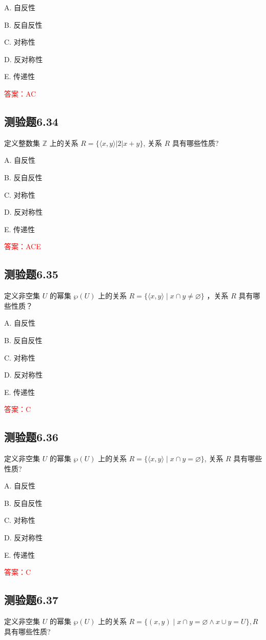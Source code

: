 \documentclass[UTF8, heading=true]{ctexart}
\begin{document}
A. 
自反性

B. 
反自反性

C. 
对称性

D. 
反对称性

E. 
传递性

\textcolor{red}{答案：AC}

\subsection{测验题6.34}

定义整数集 $\mathbb{Z}$ 上的关系 $R=\{\langle x, y\rangle|2| x+y\}$, 关系 $R$ 具有哪些性质?

A. 
自反性

B. 
反自反性

C. 
对称性

D. 
反对称性

E. 
传递性

\textcolor{red}{答案：ACE}

\subsection{测验题6.35}

定义非空集 $U$ 的幂集 $\wp(U)$ 上的关系 $R=\{\langle x, y\rangle \mid x \cap y \neq \varnothing\}$ ，关系 $R$ 具有哪些性质？

A. 自反性

B. 反自反性

C. 对称性

D. 反对称性

E. 传递性

\textcolor{red}{答案：C}


\subsection{测验题6.36}
定义非空集 $U$ 的幂集 $\wp(U)$ 上的关系 $R=\{\langle x, y\rangle \mid x \cap y=\varnothing\}$, 关系 $R$ 具有哪些性质?

A. 
自反性

B. 
反自反性

C. 
对称性

D. 
反对称性

E. 
传递性

\textcolor{red}{答案：C}

\subsection{测验题6.37}
定义非空集 $U$ 的幂集 $\wp(U)$ 上的关系 $R=\{(x, y) \mid x \cap y=\varnothing \wedge x \cup y=U\}, R$ 具有哪些性质?
\end{document}
